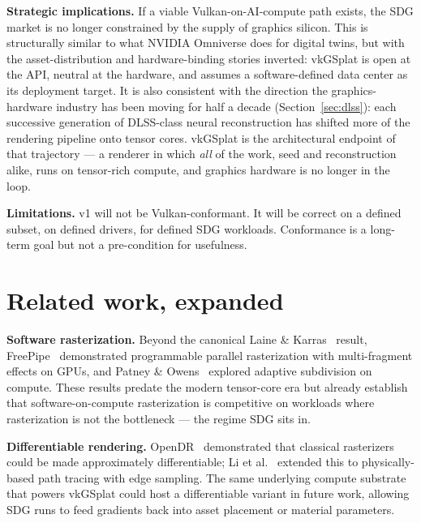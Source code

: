 \documentclass[10pt,journal]{IEEEtran}
\begin{document}
\textbf{Strategic implications.} If a viable Vulkan-on-AI-compute path
exists, the SDG market is no longer constrained by the supply of
graphics silicon. This is structurally similar to what NVIDIA Omniverse
does for digital twins, but with the asset-distribution and
hardware-binding stories inverted: vkGSplat is open at the API, neutral
at the hardware, and assumes a software-defined data center as its
deployment target. It is also consistent with the direction the
graphics-hardware industry has been moving for half a decade
(Section~\ref{sec:dlss}): each successive generation of DLSS-class
neural reconstruction has shifted more of the rendering pipeline onto
tensor cores. vkGSplat is the architectural endpoint of that
trajectory --- a renderer in which \emph{all} of the work, seed and
reconstruction alike, runs on tensor-rich compute, and graphics
hardware is no longer in the loop.

\textbf{Limitations.} v1 will not be Vulkan-conformant. It will be
correct on a defined subset, on defined drivers, for defined SDG
workloads. Conformance is a long-term goal but not a pre-condition for
usefulness.

\section{Related work, expanded}

\textbf{Software rasterization.} Beyond the canonical Laine \&
Karras~\cite{laine2011software} result, FreePipe~\cite{liu2010freepipe}
demonstrated programmable parallel rasterization with multi-fragment
effects on GPUs, and Patney \& Owens~\cite{patney2010real} explored
adaptive subdivision on compute. These results predate the modern
tensor-core era but already establish that software-on-compute
rasterization is competitive on workloads where rasterization is not
the bottleneck --- the regime SDG sits in.

\textbf{Differentiable rendering.}
OpenDR~\cite{loper2014opendr} demonstrated that classical rasterizers
could be made approximately differentiable; Li et
al.~\cite{li2018edge} extended this to physically-based path tracing
with edge sampling. The same underlying compute substrate that powers
vkGSplat could host a differentiable variant in future work, allowing
SDG runs to feed gradients back into asset placement or material
parameters.
\end{document}
